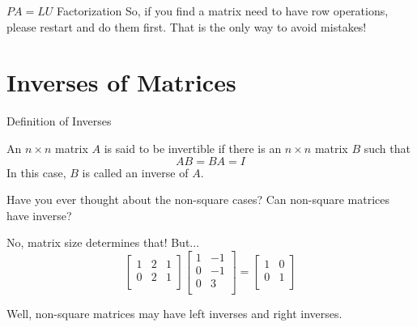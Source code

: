 \documentclass{beamer}
\begin{document}
\begin{frame}{$PA=LU$ Factorization}
So, if you find a matrix need to have row operations, please restart and do them first. That is the only way to avoid mistakes!
\end{frame}

\section{Inverses of Matrices}
\begin{frame}{Definition of Inverses}
\begin{theorem}
An $n \times n$ matrix $A$ is said to be invertible if there is an $n \times n$ matrix $B$ such that
\begin{equation*}
    AB=BA=I
\end{equation*}
In this case, $B$ is called an \alert{inverse} of $A$.
\end{theorem}

Have you ever thought about the non-square cases? Can non-square matrices have inverse?

No, matrix size determines that! But...
\begin{equation*}
    \left[ \begin{matrix}
        1&		2&		1\\
        0&		2&		1\\
    \end{matrix} \right] \left[ \begin{matrix}
        1&		-1\\
        0&		-1\\
        0&		3\\
    \end{matrix} \right] =\left[ \begin{matrix}
        1&		0\\
        0&		1\\
    \end{matrix} \right]
\end{equation*}

Well, non-square matrices may have left inverses and right inverses.
\end{frame}
\end{document}
